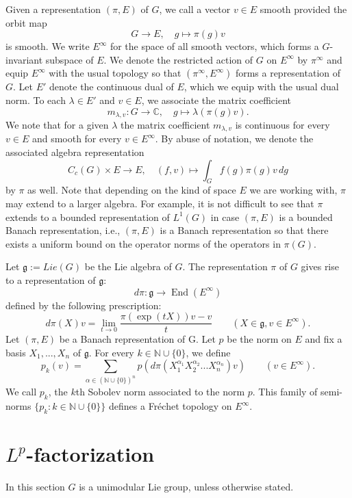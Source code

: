 \documentclass[12pt,letterpaper,titlepage,reqno]{amsart}
\theoremstyle{plain}
\theoremstyle{definition}
\numberwithin{equation}{section}
\newcommand{\End}{\operatorname{End}}
\begin{document}
Given a representation $(\pi, E)$ of $G$, we call a vector $v\in E$ smooth provided the orbit map
$$
G\rightarrow E,\quad g\mapsto \pi(g)v
$$ is smooth. We write $E^{\infty}$ for the space of all smooth vectors, which forms a $G$-invariant subspace of $E$.  We denote the restricted action of $G$ on $E^\infty$ by $\pi^{\infty}$ and equip $E^{\infty}$ with the usual topology so that $(\pi^{\infty},E^{\infty})$ forms a representation of $G$. Let $E'$ denote the continuous dual of $E$, which we equip with the usual dual norm.  To each $\lambda\in E'$ and $v\in E$, we associate the matrix coefficient
$$
m_{\lambda, v}: G\rightarrow \mathbb{C},\quad g\mapsto \lambda(\pi(g)v).
$$
We note that for a given $\lambda$ the matrix coefficient $m_{\lambda, v}$ is continuous for every $v\in E$ and smooth for every $v\in E^{\infty}$. By abuse of notation, we denote the associated algebra representation
$$
C_c(G)\times E\to E,\quad (f,v)\mapsto \int_{G}f(g)\pi(g)v\,dg
$$
by $\pi$ as well.
Note that depending on the kind of space $E$ we are working with, $\pi$ may extend to a larger algebra. For example, it is not difficult to see that $\pi$ extends to a bounded representation of  $L^1(G)$ in case $(\pi, E)$ is a bounded Banach representation, i.e., $(\pi,E)$ is a Banach representation so that  there exists a uniform bound on  the operator norms of the operators in $\pi(G)$.


Let $\mathfrak{g}:=Lie(G)$ be the Lie algebra of $G.$ The representation $\pi$ of $G$ gives rise to a representation of $\mathfrak{g}:$
$$d\pi:\mathfrak{g}\rightarrow \End(E^{\infty})$$
defined by the following prescription:
$$d\pi(X)v=\lim_{t\rightarrow 0}\frac{\pi(\exp(tX))v-v}{t} \qquad \left(X\in \mathfrak{g},  v\in E^{\infty}\right).$$
Let $(\pi, E)$ be a Banach representation of G. Let $p$ be the norm on $E$ and fix a basis $X_1,...,X_n$
of $\mathfrak{g}$. For every $k\in \mathbb{N}\cup\{0\}$, we define
$$p_k(v)=\sum_{\alpha\in(\mathbb{N}\cup\{0\})^n}p\left(d\pi(X_1^{\alpha_1} X_2^{\alpha_2}...X_n^{\alpha_n})v\right)\qquad \left(v\in E^{\infty}\right).$$ We call $p_k$, the $k$th Sobolev norm associated to the norm $p$. This family of semi-norms $\{p_k:k\in\mathbb{N}\cup\{0\}\}$ defines a Fr\'{e}chet topology on $E^{\infty}.$

\section{$L^{p}$-factorization}
In this section $G$ is a unimodular Lie group, unless otherwise stated.
\end{document}
